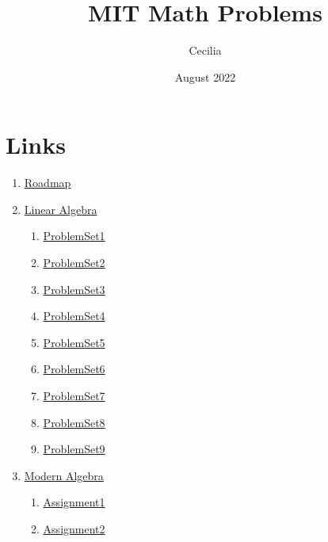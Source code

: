 \documentclass{article}
\title{MIT Math Problems}
\author{Cecilia}
\date{August 2022}
\newcommand{\emptymacro}{}    %
\newcommand{\linearalgebra}{}
\begin{document}
\maketitle

\section*{Links}
    \begin{enumerate}
        \item \href{https://math.mit.edu/academics/undergrad/roadmaps.php}{Roadmap}
        \ifx\linearalgebra\emptymacro
        \item \href{https://ocw.mit.edu/courses/18-700-linearalgebra-fall-2013/}{Linear Algebra}
        \begin{enumerate}
            \item \hyperlink{LinearAlgebra-ProblemSet1.1}{ProblemSet1}
            \item \hyperlink{LinearAlgebra-ProblemSet2.1}{ProblemSet2}
            \item \hyperlink{LinearAlgebra-ProblemSet3.1}{ProblemSet3}
            \item \hyperlink{LinearAlgebra-ProblemSet4.1}{ProblemSet4}
            \item \hyperlink{LinearAlgebra-ProblemSet5.1}{ProblemSet5}
            \item \hyperlink{LinearAlgebra-ProblemSet6.1}{ProblemSet6}
            \item \hyperlink{LinearAlgebra-ProblemSet7.1}{ProblemSet7}
            \item \hyperlink{LinearAlgebra-ProblemSet8.1}{ProblemSet8}
            \item \hyperlink{LinearAlgebra-ProblemSet9.1}{ProblemSet9}
        \end{enumerate}
        \fi
        \item \href{https://math.mit.edu/classes/18.703/index.html}{Modern Algebra}
        \begin{enumerate}
            \item \hyperlink{ModernAlgebra-Assignment01}{Assignment1}
            \item \hyperlink{ModernAlgebra-Assignment02}{Assignment2}
        \end{enumerate}
    \end{enumerate}

\ifx\linearalgebra\emptymacro
%
%








\end{document}
